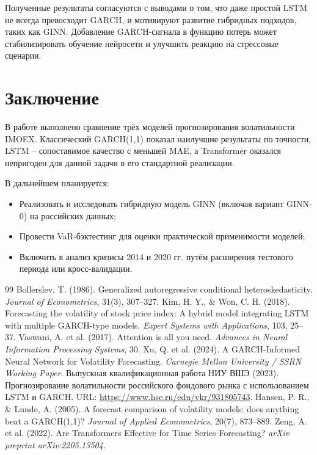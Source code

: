 \documentclass[a4paper,12pt]{article}
\begin{document}
Полученные результаты согласуются с выводами \cite{Xu2024} о том, что даже простой LSTM не всегда превосходит GARCH, и мотивируют развитие гибридных подходов, таких как GINN. Добавление GARCH-сигнала в функцию потерь может стабилизировать обучение нейросети и улучшить реакцию на стрессовые сценарии.

\section{Заключение}
В работе выполнено сравнение трёх моделей прогнозирования волатильности IMOEX. Классический GARCH(1,1) показал наилучшие результаты по точности, LSTM -- сопоставимое качество с меньшей MAE, а Transformer оказался непригоден для данной задачи в его стандартной реализации.

В дальнейшем планируется:
\begin{itemize}
\item Реализовать и исследовать гибридную модель GINN (включая вариант GINN-0) на российских данных;
\item Провести VaR-бэктестинг для оценки практической применимости моделей;
\item Включить в анализ кризисы 2014 и 2020 гг. путём расширения тестового периода или кросс-валидации.
\end{itemize}

\begin{thebibliography}{99}
 Bollerslev, T. (1986). Generalized autoregressive conditional heteroskedasticity. \textit{Journal of Econometrics}, 31(3), 307--327.
 Kim, H. Y., \& Won, C. H. (2018). Forecasting the volatility of stock price index: A hybrid model integrating LSTM with multiple GARCH-type models. \textit{Expert Systems with Applications}, 103, 25--37.
 Vaswani, A. et al. (2017). Attention is all you need. \textit{Advances in Neural Information Processing Systems}, 30.
 Xu, Q. et al. (2024). A GARCH-Informed Neural Network for Volatility Forecasting. \textit{Carnegie Mellon University / SSRN Working Paper}.
 Выпускная квалификационная работа НИУ ВШЭ (2023). Прогнозирование волатильности российского фондового рынка с использованием LSTM и GARCH. URL: \url{https://www.hse.ru/edu/vkr/931805743}.
 Hansen, P. R., \& Lunde, A. (2005). A forecast comparison of volatility models: does anything beat a GARCH(1,1)? \textit{Journal of Applied Econometrics}, 20(7), 873--889.
 Zeng, A. et al. (2022). Are Transformers Effective for Time Series Forecasting? \textit{arXiv preprint arXiv:2205.13504}.
\end{thebibliography}
\end{document}
